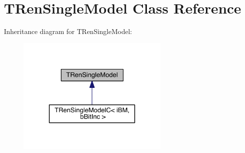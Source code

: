 \hypertarget{class_t_ren_single_model}{}\section{T\+Ren\+Single\+Model Class Reference}
\label{class_t_ren_single_model}


Inheritance diagram for T\+Ren\+Single\+Model\+:
\nopagebreak
\begin{figure}[H]
\begin{center}
\leavevmode
\includegraphics[width=211pt]{d9/d17/class_t_ren_single_model__inherit__graph}
\end{center}
\end{figure}
